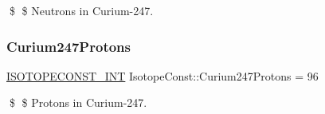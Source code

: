 \$ \$ Neutrons in Curium-\/247. \mbox{\label{group___isotope_const-_curium-_cm247_ga9bacde9b6155763d445b3797ffa37165}} 
\subsubsection{\texorpdfstring{Curium247\+Protons}{Curium247Protons}}
{\footnotesize\ttfamily \mbox{\hyperlink{group___isotope_const-_macros_ga5f18360b3e99483a35c32d789e62621c}{I\+S\+O\+T\+O\+P\+E\+C\+O\+N\+S\+T\+\_\+\+I\+NT}} Isotope\+Const\+::\+Curium247\+Protons = 96}

\$ \$ Protons in Curium-\/247. 